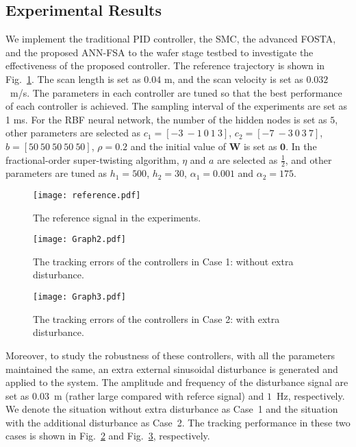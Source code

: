 \documentclass{ifacconf}
\begin{document}
\subsection{Experimental Results} \label{subsec:experimental results}
We implement the traditional PID controller, the SMC, the advanced FOSTA, and the proposed ANN-FSA to the wafer stage testbed to investigate the effectiveness of the proposed controller. The reference trajectory is shown in Fig.~\ref{fig:reference}. The scan length is set as $0.04$ m, and the scan velocity is set as $0.032$~m/s. The parameters in each controller are tuned so that the best performance of each controller is achieved. The sampling interval of the experiments are set as 1 ms. For the RBF neural network, the number of the hidden nodes is set as $5$, other parameters are selected as $c_1=[-3~-1~0~1~3]$, $c_2=[-7~-3~0~3~7]$, $b=[50~50~50~50~50]$, $\rho=0.2$ and the initial value of $\bm{W}$ is set as $\bm{0}$. In the fractional-order super-twisting algorithm, $\eta$ and $a$ are selected as $\frac{1}{2}$, and other parameters are tuned as $h_1=500$, $h_2=30$, $\alpha_1=0.001$ and $\alpha_2=175$.
   
\begin{figure}[http]
  \centering
  \texttt{[image: reference.pdf]}%
  \caption{The reference signal in the experiments.}
  \label{fig:reference}
  \end{figure}
   
\begin{figure}[http]
  \centering
  \texttt{[image: Graph2.pdf]}%
  \caption{The tracking errors of the controllers in Case 1: without extra disturbance.}
  \label{fig:errors in case 1}
  \end{figure}

\begin{figure}[http]
  \centering
  \texttt{[image: Graph3.pdf]}%
  \caption{The tracking errors of the controllers in Case 2: with extra disturbance.}
  \label{fig:errors in case 2}
  \end{figure}
   
   Moreover, to study the robustness of these controllers, with all the parameters maintained the same, an extra external sinusoidal disturbance is generated and applied to the system. The amplitude and frequency of the disturbance signal are set as $0.03$~m (rather large compared with referce signal) and $1$~Hz, respectively. We denote the situation without extra disturbance as Case~1 and the situation with the additional disturbance as Case~2. The tracking performance in these two cases is shown in Fig.~\ref{fig:errors in case 1} and Fig.~\ref{fig:errors in case 2}, respectively.
   
\end{document}
